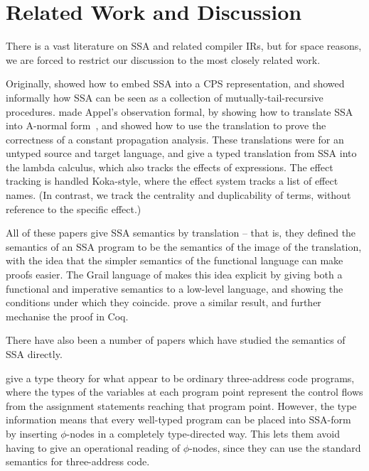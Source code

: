 \documentclass[acmsmall,screen,review]{acmart}
\begin{document}
\section{Related Work and Discussion}

There is a vast literature on SSA and related compiler IRs, but for
space reasons, we are forced to restrict our discussion to the most
closely related work.

Originally, \citet{kelsey-ssa-cps} showed how to embed SSA into a CPS
representation, and \citet{appel-ssa} showed informally how SSA can be
seen as a collection of mutually-tail-recursive
procedures. \citet{chakravarty-functional-ssa-2003} made Appel's
observation formal, by showing how to translate SSA into A-normal
form~\cite{anf}, and showed how to use the translation to prove the
correctness of a constant propagation analysis. These translations
were for an untyped source and target language, and
\citet{typed-effect-ssa-rigon-torrens-vasconcellos-20} give a typed
translation from SSA into the lambda calculus, which also tracks the
effects of expressions. The effect tracking is handled Koka-style,
where the effect system tracks a list of effect names. (In contrast,
we track the centrality and duplicability of terms, without reference
to the specific effect.)

All of these papers give SSA semantics by translation -- that is, they
defined the semantics of an SSA program to be the semantics of the
image of the translation, with the idea that the simpler semantics of
the functional language can make proofs easier. The Grail language of
\citet{beringer-imp-fun} makes this idea explicit by giving both a
functional and imperative semantics to a low-level language, and
showing the conditions under which they coincide. \citet{schneider-imp-fun} prove
a similar result, and further mechanise the proof in Coq.

There have also been a number of papers which have studied the
semantics of SSA directly.

\citet{ssa-types-matsuno-ohori-06} give a type theory for what appear
to be ordinary three-address code programs, where the types of the
variables at each program point represent the control flows from the
assignment statements reaching that program point. However, the type
information means that every well-typed program can be placed into
SSA-form by inserting $\phi$-nodes in a completely type-directed
way. This lets them avoid having to give an operational reading of
$\phi$-nodes, since they can use the standard semantics for
three-address code.
\end{document}

